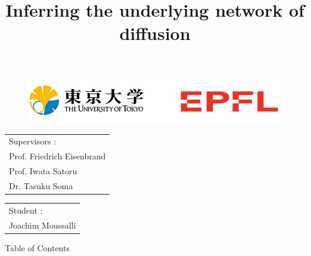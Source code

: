 \documentclass{beamer}
\title{Inferring the underlying network of diffusion}
\begin{document}
\begin{frame}
\titlepage
\begin{figure}
    \centering
    \includegraphics[scale = 0.5]{EPFL_Todai.jpg}
\end{figure}
\begin{tabular}{l}
     Supervisors :  \\
     Prof. Friedrich Eisenbrand\\
     Prof. Iwata Satoru\\
     Dr. Tasuku Soma
\end{tabular}
\hfill
\begin{tabular}{l}
     Student : \\
     Joachim Moussalli
\end{tabular}
\end{frame}

\begin{frame}{Table of Contents}
\tableofcontents
\end{frame}
\end{document}
